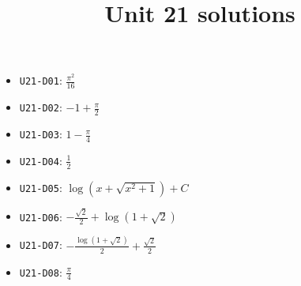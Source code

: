 \title{Unit 21 solutions}\maketitle\begin{itemize}
  \item \texttt{U21-D01}: $\frac{\pi^{2}}{16}$
  \item \texttt{U21-D02}: $-1 + \frac{\pi}{2}$
  \item \texttt{U21-D03}: $1 - \frac{\pi}{4}$
  \item \texttt{U21-D04}: $\frac{1}{2}$
  \item \texttt{U21-D05}: $\log{\left(x + \sqrt{x^{2} + 1} \right)}+C$
  \item \texttt{U21-D06}: $- \frac{\sqrt{2}}{2} + \log{\left(1 + \sqrt{2} \right)}$
  \item \texttt{U21-D07}: $- \frac{\log{\left(1 + \sqrt{2} \right)}}{2} + \frac{\sqrt{2}}{2}$
  \item \texttt{U21-D08}: $\frac{\pi}{4}$
\end{itemize}
